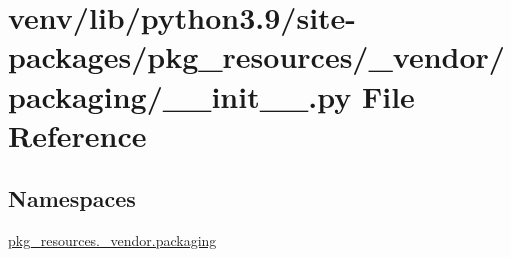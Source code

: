 \hypertarget{venv_2lib_2python3_89_2site-packages_2pkg__resources_2__vendor_2packaging_2____init_____8py}{}\section{venv/lib/python3.9/site-\/packages/pkg\+\_\+resources/\+\_\+vendor/packaging/\+\_\+\+\_\+init\+\_\+\+\_\+.py File Reference}
\label{venv_2lib_2python3_89_2site-packages_2pkg__resources_2__vendor_2packaging_2____init_____8py}
\subsection*{Namespaces}
\begin{DoxyCompactItemize}
\item 
 \hyperlink{namespacepkg__resources_1_1__vendor_1_1packaging}{pkg\+\_\+resources.\+\_\+vendor.\+packaging}
\end{DoxyCompactItemize}
